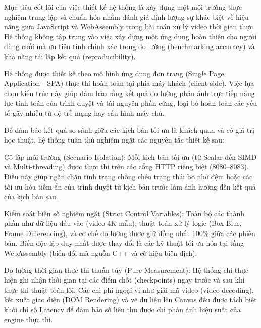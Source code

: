 


Mục tiêu cốt lõi của việc thiết kế hệ thống là xây dựng một môi trường thực nghiệm trung lập và chuẩn hóa nhằm đánh giá định lượng sự khác biệt về hiệu năng giữa JavaScript và WebAssembly trong bài toán xử lý video thời gian thực. Hệ thống không tập trung vào việc xây dựng một ứng dụng hoàn thiện cho người dùng cuối mà ưu tiên tính chính xác trong đo lường (benchmarking accuracy) và khả năng tái lập kết quả (reproducibility).


Hệ thống được thiết kế theo mô hình ứng dụng đơn trang (Single Page Application - SPA) thực thi hoàn toàn tại phía máy khách (client-side). Việc lựa chọn kiến trúc này giúp đảm bảo rằng kết quả đo lường phản ánh trực tiếp năng lực tính toán của trình duyệt và tài nguyên phần cứng, loại bỏ hoàn toàn các yếu tố gây nhiễu từ độ trễ mạng hay cấu hình máy chủ.



Để đảm bảo kết quả so sánh giữa các kịch bản tối ưu là khách quan và có giá trị học thuật, hệ thống tuân thủ nghiêm ngặt các nguyên tắc thiết kế sau:


Cô lập môi trường (Scenario Isolation): Mỗi kịch bản tối ưu (từ Scalar đến SIMD và Multi-threading) được thực thi trên các cổng HTTP riêng biệt (8080–8083). Điều này giúp ngăn chặn tình trạng chồng chéo trạng thái bộ nhớ đệm hoặc các tối ưu hóa tiềm ẩn của trình duyệt từ kịch bản trước làm ảnh hưởng đến kết quả của kịch bản sau.


Kiểm soát biến số nghiêm ngặt (Strict Control Variables): Toàn bộ các thành phần như dữ liệu đầu vào (video 4K mẫu), thuật toán xử lý logic (Box Blur, Frame Differencing), và cơ chế đo lường được giữ đồng nhất 100\% giữa các phiên bản. Biến độc lập duy nhất được thay đổi là các kỹ thuật tối ưu hóa tại tầng WebAssembly (biến đổi mã nguồn C++ và cờ hiệu biên dịch).


Đo lường thời gian thực thi thuần túy (Pure Measurement): Hệ thống chỉ thực hiện ghi nhận thời gian tại các điểm chốt (checkpoints) ngay trước và sau khi thực thi thuật toán lõi. Các chi phí ngoại vi như giải mã video (video decoding), kết xuất giao diện (DOM Rendering) và vẽ dữ liệu lên Canvas đều được tách biệt khỏi chỉ số Latency để đảm bảo số liệu thu được chỉ phản ánh hiệu suất của engine thực thi.



